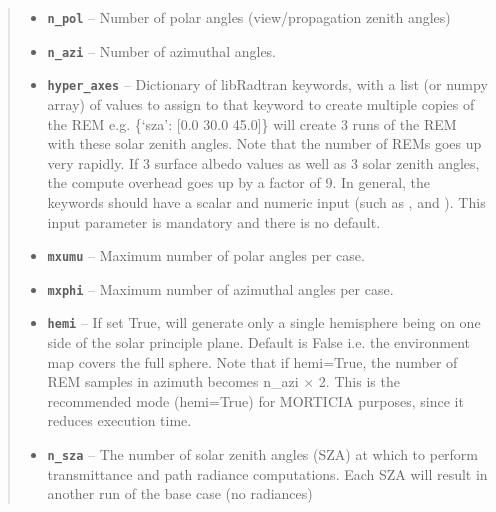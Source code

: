\documentclass[a4paper,10pt,english]{sphinxmanual}
\begin{document}
\begin{fulllineitems}
\begin{fulllineitems}
\begin{quote}
\begin{description}
\begin{itemize}
\item {} 
\textbf{\texttt{n\_pol}} -- Number of polar angles (view/propagation zenith angles)

\item {} 
\textbf{\texttt{n\_azi}} -- Number of azimuthal angles.

\item {} 
\textbf{\texttt{hyper\_axes}} -- Dictionary of libRadtran keywords, with a list (or numpy array) of values to assign  to
that keyword to create multiple copies of the REM e.g. \{`sza': {[}0.0 30.0 45.0{]}\} will create 3 runs of the
REM with these solar zenith angles. Note that the number of REMs goes up very rapidly. If 3 surface
albedo values as well as 3 solar zenith angles, the compute overhead goes up by a factor of 9.
In general, the keywords should have a scalar and numeric input (such as ,  and
). This input parameter is mandatory and there is no default.

\item {} 
\textbf{\texttt{mxumu}} -- Maximum number of polar angles per case.

\item {} 
\textbf{\texttt{mxphi}} -- Maximum number of azimuthal angles per case.

\item {} 
\textbf{\texttt{hemi}} -- If set True, will generate only a single hemisphere being on one side of
the solar principle plane. Default is False i.e. the environment map covers the full sphere.
Note that if hemi=True, the number of REM samples in azimuth becomes n\_azi \(\times\) 2.
This is the recommended mode (hemi=True) for MORTICIA purposes, since it reduces execution time.

\item {} 
\textbf{\texttt{n\_sza}} -- The number of solar zenith angles (SZA) at which to perform transmittance and path radiance
computations. Each SZA will result in another run of the base case (no radiances)

\end{itemize}

\end{description}\end{quote}

\end{fulllineitems}


\end{fulllineitems}

\end{document}
